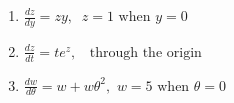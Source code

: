 \documentclass[11pt,letterpaper]{article}
\begin{document}
\begin{enumerate}
\begin{enumerate}
\vspace{10pc}
\item $\frac{dz}{dy}=zy,\;\;z=1\text{ when }y=0$

\vspace{10pc}
\item $\frac{dz}{dt}=te^z,\;\;\text{ through the origin}$

\vspace{10pc}
\item $\frac{dw}{d\theta}=w+w\theta^2,\,\,w=5\text{ when }\theta=0$

\end{enumerate}

\end{enumerate}
\end{document}
